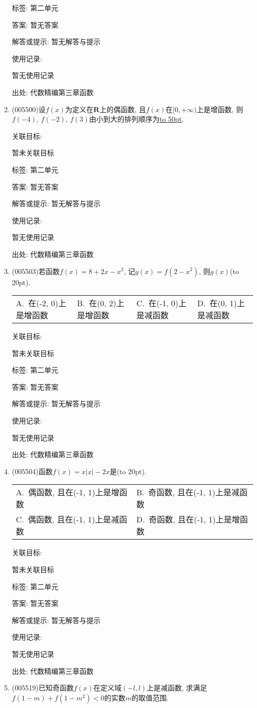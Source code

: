 \documentclass[10pt,a4paper]{article}
\newcommand{\blank}[1]{\underline{\hbox to #1pt{}}}
\newcommand{\bracket}[1]{(\hbox to #1pt{})}
\newcommand{\twoch}[4]{\par\begin{tabular}{p{.46\textwidth}p{.46\textwidth}}
A.~#1& B.~#2\\
C.~#3& D.~#4
\end{tabular}}
\newcommand{\fourch}[4]{\par\begin{tabular}{p{.23\textwidth}p{.23\textwidth}p{.23\textwidth}p{.23\textwidth}}
A.~#1 &B.~#2& C.~#3& D.~#4
\end{tabular}}
\begin{document}
\begin{enumerate}[1.]
标签: 第二单元

答案: 暂无答案

解答或提示: 暂无解答与提示

使用记录:

暂无使用记录


出处: 代数精编第三章函数
\item { (005500)}设$f(x)$为定义在$\mathbf{R}$上的偶函数, 且$f(x)$在$[0,+\infty)$上是增函数, 则$f(-4)$, $f(-2)$, $f(3)$由小到大的排列顺序为\blank{50}.


关联目标:

暂未关联目标



标签: 第二单元

答案: 暂无答案

解答或提示: 暂无解答与提示

使用记录:

暂无使用记录


出处: 代数精编第三章函数
\item { (005503)}若函数$f(x)=8+2x-x^2$, 记$g(x)=f(2-x^2)$, 则$g(x)$\bracket{20}.
\fourch{在(-2, 0)上是增函数}{在(0, 2)上是增函数}{在(-1, 0)上是减函数}{在(0, 1)上是减函数}


关联目标:

暂未关联目标



标签: 第二单元

答案: 暂无答案

解答或提示: 暂无解答与提示

使用记录:

暂无使用记录


出处: 代数精编第三章函数
\item { (005504)}函数$f(x)=x|x|-2x$是\bracket{20}.
\twoch{偶函数, 且在(-1, 1)上是增函数}{奇函数, 且在(-1, 1)上是减函数}{偶函数, 且在(-1, 1)上是减函数}{奇函数, 且在(-1, 1)上是增函数}


关联目标:

暂未关联目标



标签: 第二单元

答案: 暂无答案

解答或提示: 暂无解答与提示

使用记录:

暂无使用记录


出处: 代数精编第三章函数
\item { (005519)}已知奇函数$f(x)$在定义域$(-l, l)$上是减函数, 求满足$f(1-m)+f(1-m^2)<0$的实数$m$的取值范围.



\end{enumerate}
\end{document}
